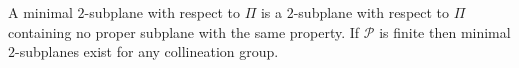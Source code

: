 A minimal $2$-subplane with respect to $\Pi$ is a $2$-subplane with respect to $\Pi$ containing no proper subplane with the same property. If $\mathcal{P}$ is finite then minimal $2$-subplanes exist for any collineation group.
